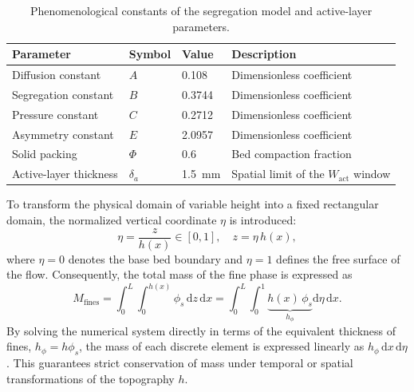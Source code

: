 \documentclass[lineno]{JFM-FLM_Au}
\begin{document}
\begin{table}
  \begin{center}
  \begin{tabular}{llll}
    \toprule
    Parameter & Symbol & Value & Description \\
    \midrule
    Diffusion constant      & $A$        & 0.108  & Dimensionless coefficient \\
    Segregation constant    & $B$        & 0.3744 & Dimensionless coefficient \\
    Pressure constant       & $C$        & 0.2712 & Dimensionless coefficient \\
    Asymmetry constant      & $E$        & 2.0957 & Dimensionless coefficient \\
    Solid packing           & $\Phi$      & 0.6    & Bed compaction fraction \\
    Active-layer thickness  & $\delta_a$ & 1.5~mm & Spatial limit of the $W_{\mathrm{act}}$ window \\
    \bottomrule
  \end{tabular}
  \caption{Phenomenological constants of the segregation model and active-layer parameters.}
  \label{tab:constants}
  \end{center}
\end{table}
To transform the physical domain of variable height into a fixed rectangular domain, the normalized vertical coordinate $\eta$ is introduced:
\begin{equation}
    \eta = \frac{z}{h(x)} \in [0, 1], \quad z = \eta \, h(x),
\end{equation}
where $\eta = 0$ denotes the base bed boundary and $\eta = 1$ defines the free surface of the flow. Consequently, the total mass of the fine phase is expressed as
\begin{equation}
    M_{\text{fines}} = \int_{0}^{L} \int_{0}^{h(x)} \phi_s \, \mathrm{d}z \, \mathrm{d}x = \int_{0}^{L} \int_{0}^{1} \underbrace{h(x) \, \phi_s}_{h_{\phi}} \mathrm{d}\eta \, \mathrm{d}x.
\end{equation}
By solving the numerical system directly in terms of the equivalent thickness of fines, $h_{\phi} = h \phi_s$, the mass of each discrete element is expressed linearly as $h_{\phi} \, \mathrm{d}x \, \mathrm{d}\eta$. This guarantees strict conservation of mass under temporal or spatial transformations of the topography $h$.
\end{document}
